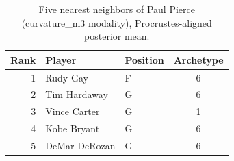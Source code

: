 \begin{table}[htbp]
  \centering\small
  \begin{tabular}{rllc}
    \toprule
    Rank & Player & Position & Archetype \\
    \midrule
    1 & Rudy Gay & F & 6 \\
    2 & Tim Hardaway & G & 6 \\
    3 & Vince Carter & G & 1 \\
    4 & Kobe Bryant & G & 6 \\
    5 & DeMar DeRozan & G & 6 \\
    \bottomrule
  \end{tabular}
  \caption{Five nearest neighbors of Paul Pierce (curvature_m3 modality), Procrustes-aligned posterior mean.}
  \label{tab:Paul_Pierce_neighbors_curvature_m3}
\end{table}

